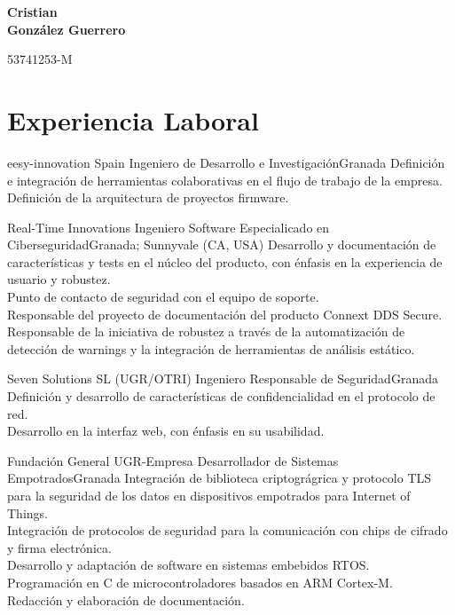 \documentclass[11pt,a4paper,sans,spanish]{moderncv}
\begin{document}
\begin{minipage}[c]{\textwidth-110pt-0.2em}
    \begin{flushright}
        \textbf{\Huge{Cristian\\\vspace{4pt}González Guerrero}}

        \vspace{4pt}
        \small{53741253-M}
    \end{flushright}
\end{minipage}
\vspace{-5em}

\makecvtitle

\section{Experiencia Laboral}

{eesy-innovation Spain}
{Ingeniero de Desarrollo e Investigación}{Granada}{}
{Definición e integración de herramientas colaborativas en el flujo de trabajo de la empresa.\\
Definición de la arquitectura de proyectos firmware.
}


{Real-Time Innovations}
{Ingeniero Software Especialicado en Ciberseguridad}{Granada; Sunnyvale (CA, USA)}{}
{Desarrollo y documentación de características y tests en el núcleo del producto, con énfasis en la experiencia de usuario y robustez.\\
Punto de contacto de seguridad con el equipo de soporte.\\
Responsable del proyecto de documentación del producto Connext DDS Secure.\\
Responsable de la iniciativa de robustez a través de la automatización de detección de warnings y la integración de herramientas de análisis estático.}

{Seven Solutions SL (UGR/OTRI)}
{Ingeniero Responsable de Seguridad}{Granada}{}
{Definición y desarrollo de características de confidencialidad en el protocolo de red.\\
Desarrollo en la interfaz web, con énfasis en su usabilidad.}

{Fundación General UGR-Empresa}
{Desarrollador de Sistemas Empotrados}{Granada}{}
{Integración de biblioteca criptográgrica y protocolo TLS para la seguridad de los datos en dispositivos empotrados para Internet of Things.\\
Integración de protocolos de seguridad para la comunicación con chips de cifrado y firma electrónica.\\
Desarrollo y adaptación de software en sistemas embebidos RTOS.\\
Programación en C de microcontroladores basados en ARM Cortex-M.\\
Redacción y elaboración de documentación.
}
\end{document}

